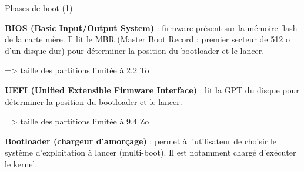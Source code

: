 \documentclass[12pt, t]{beamer}
\begin{document}
\begin{frame}{Phases de boot (1)}

    \vspace{10pt}
    {\textbf{BIOS (Basic Input/Output System)}} : firmware présent sur la
    mémoire flash de la carte mère. Il lit le MBR (Master Boot Record : premier
    secteur de 512 o d'un disque dur) pour déterminer la position du bootloader
    et le lancer.

    \vspace{8pt}
    => taille des partitions limitée à 2.2 To

    {
        \vspace{10pt}
        {\textbf{UEFI (Unified Extensible Firmware Interface)}} : lit la GPT du
        disque pour déterminer la position du bootloader et le lancer.

        \vspace{8pt}
        => taille des partitions limitée à 9.4 Zo %
    }

    {
        \vspace{10pt}
        {\textbf{Bootloader (chargeur d'amorçage)}} : permet à l'utilisateur de
        choisir le système d'exploitation à lancer (multi-boot). Il est
        notamment chargé d'exécuter le kernel.
    }

\end{frame}
\end{document}
